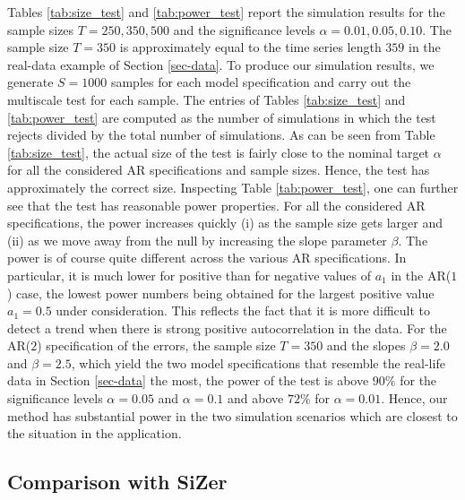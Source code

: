 Tables \ref{tab:size_test} and \ref{tab:power_test} report the simulation results for the sample sizes $T=250,350,500$ and the significance levels $\alpha = 0.01, 0.05, 0.10$. The sample size $T = 350$ is approximately equal to the time series length $359$ in the real-data example of Section \ref{sec-data}. To produce our simulation results, we generate $S=1000$ samples for each model specification and carry out the multiscale test for each sample. The entries of Tables \ref{tab:size_test} and \ref{tab:power_test} are computed as the number of simulations in which the test rejects divided by the total number of simulations. As can be seen from Table \ref{tab:size_test}, the actual size of the test is fairly close to the nominal target $\alpha$ for all the considered AR specifications and sample sizes. Hence, the test has approximately the correct size. Inspecting Table \ref{tab:power_test}, one can further see that the test has reasonable power properties. For all the considered AR specifications, the power increases quickly (i) as the sample size gets larger and (ii) as we move away from the null by increasing the slope parameter $\beta$. The power is of course quite different across the various AR specifications. In particular, it is much lower for positive than for negative values of $a_1$ in the AR($1$) case, the lowest power numbers being obtained for the largest positive value $a_1 = 0.5$ under consideration. This reflects the fact that it is more difficult to detect a trend when there is strong positive autocorrelation in the data. For the AR($2$) specification of the errors, the sample size $T=350$ and the slopes $\beta = 2.0$ and $\beta = 2.5$, which yield the two model specifications that resemble the real-life data in Section \ref{sec-data} the most, the power of the test is above $90\%$ for the significance levels $\alpha = 0.05$ and $\alpha = 0.1$ and above $72\%$ for $\alpha = 0.01$. Hence, our method has substantial power in the two simulation scenarios which are closest to the situation in the application. 


\subsection{Comparison with SiZer}\label{subsec-sim-2}


